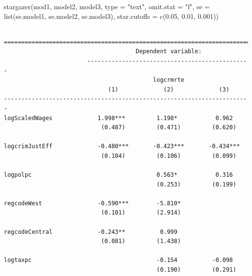 \documentclass[]{article}
\newenvironment{Shaded}{}{}
\newcommand{\DataTypeTok}[1]{#1}
\newcommand{\FloatTok}[1]{#1}
\newcommand{\KeywordTok}[1]{\textcolor[rgb]{0.00,0.00,1.00}{#1}}
\newcommand{\NormalTok}[1]{#1}
\newcommand{\StringTok}[1]{\textcolor[rgb]{0.00,0.50,0.50}{#1}}
\begin{document}
\begin{Shaded}
\begin{Highlighting}[]
\KeywordTok{stargazer}\NormalTok{(mod1, model2, model3, }\DataTypeTok{type =} \StringTok{"text"}\NormalTok{, }\DataTypeTok{omit.stat =} \StringTok{"f"}\NormalTok{,}
          \DataTypeTok{se =} \KeywordTok{list}\NormalTok{(se.model1, se.model2, se.model3),}
          \DataTypeTok{star.cutoffs =} \KeywordTok{c}\NormalTok{(}\FloatTok{0.05}\NormalTok{, }\FloatTok{0.01}\NormalTok{, }\FloatTok{0.001}\NormalTok{))}
\end{Highlighting}
\end{Shaded}

\begin{verbatim}

=======================================================================
                                      Dependent variable:              
                        -----------------------------------------------
                                           logcrmrte                   
                              (1)             (2)             (3)      
-----------------------------------------------------------------------
logScaledWages             1.998***         1.198*           0.962     
                            (0.487)         (0.471)         (0.620)    
                                                                       
logcrimJustEff             -0.480***       -0.423***       -0.434***   
                            (0.104)         (0.106)         (0.099)    
                                                                       
logpolpc                                    0.563*           0.316     
                                            (0.253)         (0.199)    
                                                                       
regcodeWest                -0.590***        -5.810*                    
                            (0.101)         (2.914)                    
                                                                       
regcodeCentral             -0.243**          0.999                     
                            (0.081)         (1.438)                    
                                                                       
logtaxpc                                    -0.154          -0.098     
                                            (0.190)         (0.291)    
                                                                       

\end{verbatim}
\end{document}
